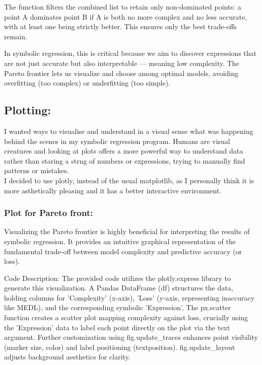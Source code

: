 \documentclass{article}
\begin{document}
The function filters the combined list to retain only non-dominated points: a point A dominates point B if A is both no more complex and no less accurate, with at least one being strictly better. This ensures only the best trade-offs remain.

In symbolic regression, this is critical because we aim to discover expressions that are not just accurate but also interpretable — meaning low complexity. The Pareto frontier lets us visualize and choose among optimal models, avoiding overfitting (too complex) or underfitting (too simple).



\subsection{Plotting: }

I wanted ways to visualise and understand in a visual sense what was happening behind the scenes in my symbolic regression program. Humans are visual creatures and looking at plots offers a more powerful way to understand data rather than staring a strng of numbers or expressions, trying to manually find patterns or mistakes.\\ 

I decided to use plotly, instead of the usual matplotlib, as I personally think it is more asthetically pleasing and it has a better interactive environment.\\ 

\subsubsection{Plot for Pareto front: }

Visualizing the Pareto frontier is highly beneficial for interpreting the results of symbolic regression. It provides an intuitive graphical representation of the fundamental trade-off between model complexity and predictive accuracy (or loss).

Code Description: The provided code utilizes the plotly.express library to generate this visualization. A Pandas DataFrame (df) structures the data, holding columns for 'Complexity' (x-axis), 'Loss' (y-axis, representing inaccuracy like MEDL), and the corresponding symbolic 'Expression'. The px.scatter function creates a scatter plot mapping complexity against loss, crucially using the 'Expression' data to label each point directly on the plot via the text argument. Further customization using fig.update_traces enhances point visibility (marker size, color) and label positioning (textposition). fig.update_layout adjusts background aesthetics for clarity.
\end{document}
